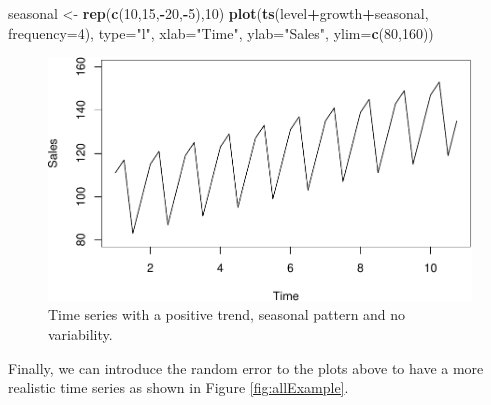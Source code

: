 \documentclass[]{book}
\newenvironment{Shaded}{\begin{snugshade}}{\end{snugshade}}
\newcommand{\DataTypeTok}[1]{\textcolor[rgb]{0.13,0.29,0.53}{#1}}
\newcommand{\DecValTok}[1]{\textcolor[rgb]{0.00,0.00,0.81}{#1}}
\newcommand{\KeywordTok}[1]{\textcolor[rgb]{0.13,0.29,0.53}{\textbf{#1}}}
\newcommand{\NormalTok}[1]{#1}
\newcommand{\OperatorTok}[1]{\textcolor[rgb]{0.81,0.36,0.00}{\textbf{#1}}}
\newcommand{\StringTok}[1]{\textcolor[rgb]{0.31,0.60,0.02}{#1}}
\theoremstyle{definition}
\theoremstyle{definition}
\theoremstyle{definition}
\theoremstyle{definition}
\theoremstyle{remark}
\begin{document}
\begin{Shaded}
\begin{Highlighting}[]
\NormalTok{seasonal <-}\StringTok{ }\KeywordTok{rep}\NormalTok{(}\KeywordTok{c}\NormalTok{(}\DecValTok{10}\NormalTok{,}\DecValTok{15}\NormalTok{,}\OperatorTok{-}\DecValTok{20}\NormalTok{,}\OperatorTok{-}\DecValTok{5}\NormalTok{),}\DecValTok{10}\NormalTok{)}
\KeywordTok{plot}\NormalTok{(}\KeywordTok{ts}\NormalTok{(level}\OperatorTok{+}\NormalTok{growth}\OperatorTok{+}\NormalTok{seasonal, }\DataTypeTok{frequency=}\DecValTok{4}\NormalTok{),}
     \DataTypeTok{type=}\StringTok{"l"}\NormalTok{, }\DataTypeTok{xlab=}\StringTok{"Time"}\NormalTok{, }\DataTypeTok{ylab=}\StringTok{"Sales"}\NormalTok{, }\DataTypeTok{ylim=}\KeywordTok{c}\NormalTok{(}\DecValTok{80}\NormalTok{,}\DecValTok{160}\NormalTok{))}
\end{Highlighting}
\end{Shaded}

\begin{figure}
\centering
\includegraphics{Svetunkov--2022----ADAM_files/figure-latex/seasonalExample-1.pdf}
\caption{\label{fig:seasonalExample}Time series with a positive trend, seasonal pattern and no variability.}
\end{figure}

Finally, we can introduce the random error to the plots above to have a more realistic time series as shown in Figure \ref{fig:allExample}.
\end{document}
